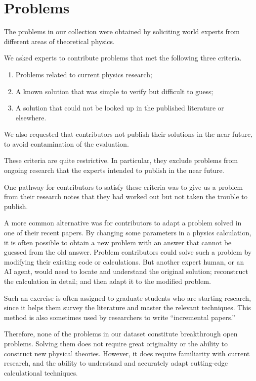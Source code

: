 \documentclass[aps,prd,reprint,superscriptaddress,nofootinbib]{revtex4-2}
\begin{document}
\section{Problems \label{secdescription}}

The problems in our collection were obtained by soliciting world experts from different areas of theoretical physics.

We asked experts to contribute problems that met the following three criteria.
\begin{enumerate}
\item
Problems related to current physics research;
\item
A known solution that was simple to verify but difficult to guess;
\item
A solution that could not be looked up in the published literature or elsewhere.
\end{enumerate}
We also requested that contributors not publish their solutions in the
near future, to avoid contamination of the evaluation.

These criteria are quite restrictive. In particular, they exclude problems from ongoing research that the experts intended to publish in the near future.

One pathway for contributors to satisfy these criteria was to give us a problem from their research notes that they had worked out but not taken the trouble to publish.

A more common alternative was for contributors to adapt a problem solved in one of their recent papers. By changing some parameters in a physics calculation, it is often possible to obtain a new problem with an answer that cannot be guessed from the old answer. Problem contributors could solve such a  problem by modifying their existing code or calculations. But another expert human, or an AI agent, would need to locate and understand the original solution; reconstruct the calculation in detail; and then adapt it to the modified problem. 

Such an exercise is often assigned to graduate students who are starting research, since it helps them survey the literature and master the relevant techniques.  This method is also sometimes used by researchers to write ``incremental papers.'' 

Therefore, none of the problems in our dataset constitute breakthrough open problems. Solving them does not require great originality or the ability to construct new physical theories. However, it does require familiarity with current research, and the ability to understand and accurately adapt cutting-edge calculational techniques.
\end{document}
